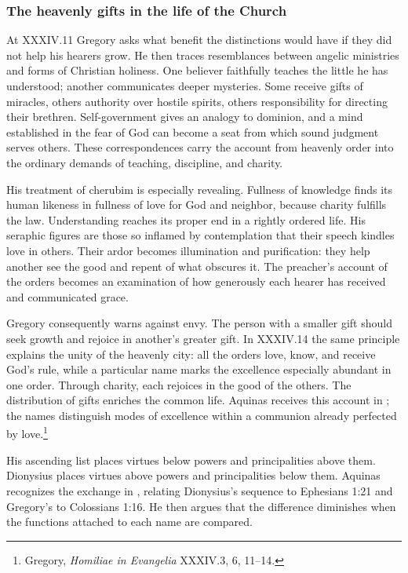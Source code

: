 \subsubsection{The heavenly gifts in the life of the Church}

At XXXIV.11 Gregory asks what benefit the distinctions would have if they did not help his hearers grow. He then traces resemblances between angelic ministries and forms of Christian holiness. One believer faithfully teaches the little he has understood; another communicates deeper mysteries. Some receive gifts of miracles, others authority over hostile spirits, others responsibility for directing their brethren. Self-government gives an analogy to dominion, and a mind established in the fear of God can become a seat from which sound judgment serves others. These correspondences carry the account from heavenly order into the ordinary demands of teaching, discipline, and charity.

His treatment of cherubim is especially revealing. Fullness of knowledge finds its human likeness in fullness of love for God and neighbor, because charity fulfills the law. Understanding reaches its proper end in a rightly ordered life. His seraphic figures are those so inflamed by contemplation that their speech kindles love in others. Their ardor becomes illumination and purification: they help another see the good and repent of what obscures it. The preacher's account of the orders becomes an examination of how generously each hearer has received and communicated grace.

Gregory consequently warns against envy. The person with a smaller gift should seek growth and rejoice in another's greater gift. In XXXIV.14 the same principle explains the unity of the heavenly city: all the orders love, know, and receive God's rule, while a particular name marks the excellence especially abundant in one order. Through charity, each rejoices in the good of the others. The distribution of gifts enriches the common life. Aquinas receives this account in ; the names distinguish modes of excellence within a communion already perfected by love.\footnote{Gregory, \emph{Homiliae in Evangelia} XXXIV.3, 6, 11--14.}

His ascending list places virtues below powers and principalities above them. Dionysius places virtues above powers and principalities below them. Aquinas recognizes the exchange in , relating Dionysius's sequence to Ephesians 1:21 and Gregory's to Colossians 1:16. He then argues that the difference diminishes when the functions attached to each name are compared.

